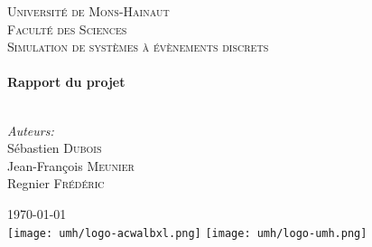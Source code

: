  \thispagestyle{empty}
\begin{center}
 
\textsc{\LARGE Université de Mons-Hainaut}\\[0.5cm]
\textsc{\Large Faculté des Sciences}\\[4.0cm]
\textsc{\Large Simulation de systèmes à évènements discrets}\\[0.5cm]
 
 
\HRule \\[0.4cm]
{ \Large \bfseries Rapport du projet}\\[0.3cm]
 
\HRule \\[1.5cm]
 
\begin{minipage}{0.4\textwidth}
\begin{flushleft} \large
\emph{Auteurs:} 
\\ Sébastien \textsc{Dubois}
\\ Jean-François \textsc{Meunier}
\\ Regnier \textsc{Frédéric}

\end{flushleft}
\end{minipage}
\begin{minipage}{0.4\textwidth}
\begin{flushright} \large
\end{flushright}
\end{minipage}


\vfill

{\Large \today}\\[1.5cm]

\texttt{[image: umh/logo-acwalbxl.png]}
\texttt{[image: umh/logo-umh.png]}

\end{center}


\newpage
\thispagestyle{empty}
\mbox{}
\newpage
